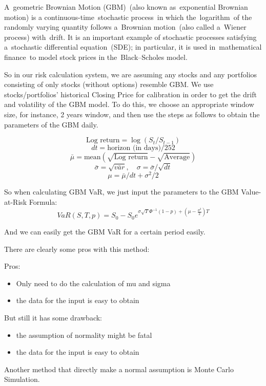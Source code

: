 \documentclass[letterpaper,11pt, oneside]{layout}
\begin{document}
A geometric Brownian Motion (GBM) (also known as exponential Brownian motion) is a continuous-time stochastic process in which the logarithm of the randomly varying quantity follows a Brownian motion (also called a Wiener process) with drift. It is an important example of stochastic processes satisfying a stochastic differential equation (SDE); in particular, it is used in mathematical finance to model stock prices in the Black–Scholes model. 

So in our risk calculation system, we are assuming any stocks and any portfolios consisting of only stocks (without options) resemble GBM. We use stocks/portfolios’ historical Closing Price for calibration in order to get the drift and volatility of the GBM model. To do this, we choose an appropriate window size, for instance, 2 years window, and then use the steps as follows to obtain the parameters of the GBM daily. 

\[\text{Log return}=\log(S_t/S_{t-1})\]
\[dt=\text{horizon (in days)}/252\]
\[\bar{\mu}=\text{mean}(\sqrt{\text{Log return}}-\sqrt{\text{Average}})\]
\[\bar{\sigma}=\sqrt{\bar{var}}, \quad \sigma=\bar{\sigma}/\sqrt{dt}\]
\[\mu=\bar{\mu}/dt+\sigma^2/2\]

So when calculating GBM VaR, we just input the parameters to the GBM Value-at-Risk Formula: 
\begin{equation}
VaR(S, T, p)=S_0-S_0 e^{\sigma\sqrt{T}\Phi^{-1}(1-p)+ (\mu-\frac{\sigma^2}{2})T}
\end{equation}

And we can easily get the GBM VaR for a certain period easily.


There are clearly some pros with this method:

Pros: 
\begin{itemize}
\item Only need to do the calculation of mu and sigma
\item the data for the input is easy to obtain
\end{itemize}

But still it has some drawback:
\begin{itemize}
\item the assumption of normality might be fatal
\item the data for the input is easy to obtain
\end{itemize}

Another method that directly make a normal assumption is Monte Carlo Simulation.
\end{document}
